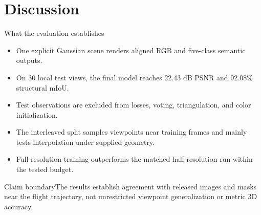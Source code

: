 \documentclass[aspectratio=169,10pt]{beamer}
\begin{document}
\section{Discussion}
\begin{frame}{What the evaluation establishes}
\begin{itemize}\tightitems
\item One explicit Gaussian scene renders aligned RGB and five-class semantic outputs.
\item On 30 local test views, the final model reaches 22.43 dB PSNR and 92.08\% structural mIoU.
\item Test observations are excluded from losses, voting, triangulation, and color initialization.
\item The interleaved split samples viewpoints near training frames and mainly tests interpolation under supplied geometry.
\item Full-resolution training outperforms the matched half-resolution run within the tested budget.
\end{itemize}
\begin{alertblock}{Claim boundary}The results establish agreement with released images and masks near the flight trajectory, not unrestricted viewpoint generalization or metric 3D accuracy.\end{alertblock}
\end{frame}
\end{document}
